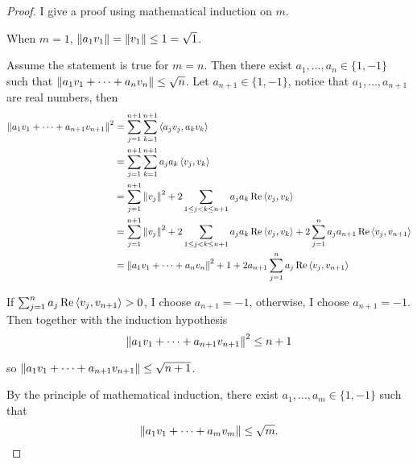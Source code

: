 \begin{proof}
    I give a proof using mathematical induction on $m$.

    When $m = 1$, $\left\Vert{a_{1}v_{1}}\right\Vert = \left\Vert{v_{1}}\right\Vert\leq 1 = \sqrt{1}$.

    Assume the statement is true for $m = n$. Then there exist $a_{1}, \ldots, a_{n}\in \{ 1, -1 \}$ such that $\left\Vert{a_{1}v_{1} + \cdots + a_{n}v_{n}}\right\Vert \leq \sqrt{n}$. Let $a_{n+1}\in \{ 1, -1 \}$, notice that $a_{1}, \ldots, a_{n+1}$ are real numbers, then
    \begin{align*}
        \left\Vert{a_{1}v_{1} + \cdots + a_{n+1}v_{n+1}}\right\Vert^{2} & = \sum^{n+1}_{j=1}\sum^{n+1}_{k=1}\left\langle{a_{j}v_{j}, a_{k}v_{k}}\right\rangle                                                                                                                       \\
                                                        & = \sum^{n+1}_{j=1}\sum^{n+1}_{k=1}a_{j}a_{k}\left\langle{v_{j}, v_{k}}\right\rangle                                                                                                                       \\
                                                        & = \sum^{n+1}_{j=1}\left\Vert{v_{j}}\right\Vert^{2} + 2\sum_{1\leq j<k\leq n+1}a_{j}a_{k}\operatorname{Re}\left\langle{v_{j},v_{k}}\right\rangle                                                                           \\
                                                        & = \sum^{n+1}_{j=1}\left\Vert{v_{j}}\right\Vert^{2} + 2\sum_{1\leq j<k\leq n+1}a_{j}a_{k}\operatorname{Re}\left\langle{v_{j}, v_{k}}\right\rangle + 2\sum^{n}_{j=1}a_{j}a_{n+1}\operatorname{Re}\left\langle{v_{j}, v_{n+1}}\right\rangle \\
                                                        & = \left\Vert{a_{1}v_{1} + \cdots + a_{n}v_{n}}\right\Vert^{2} + 1 + 2a_{n+1}\sum^{n}_{j=1}a_{j}\operatorname{Re}\left\langle{v_{j}, v_{n+1}}\right\rangle
    \end{align*}

    If $\sum^{n}_{j=1}a_{j}\operatorname{Re}\left\langle{v_{j}, v_{n+1}}\right\rangle > 0$, I choose $a_{n+1} = -1$, otherwise, I choose $a_{n+1} = -1$. Then together with the induction hypothesis
    \[
        \left\Vert{a_{1}v_{1} + \cdots + a_{n+1}v_{n+1}}\right\Vert^{2} \leq n+1
    \]

    so $\left\Vert{a_{1}v_{1} + \cdots + a_{n+1}v_{n+1}}\right\Vert \leq \sqrt{n+1}$.

    By the principle of mathematical induction, there exist $a_{1}, \ldots, a_{m}\in \{ 1, -1 \}$ such that
    \[
        \left\Vert{a_{1}v_{1} + \cdots + a_{m}v_{m}}\right\Vert \leq \sqrt{m}.
    \]
\end{proof}
\newpage

